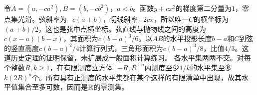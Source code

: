\documentclass[UTF8,fontset=fandol,11pt]{ctexart}
\begin{document}
令$A=(a,-ca^2),B=(b,-cb^2)$，$a<b$。函数$y+cx^2$的梯度第二分量为$1$，零点集光滑。弦斜率为$-c(a+b)$，切线斜率$-2cx$，所以唯一$C$的横坐标为$(a+b)/2$，这也是弦中点横坐标。弦直线与抛物线之间的高度为$c(x-a)(b-x)$，其面积为$c(b-a)^3/6$。以$AB$的水平投影长度$b-a$和$C$到弦的竖直高度$c(b-a)^2/4$计算行列式，三角形面积为$c(b-a)^3/8$，比值$4/3$。这道历史定理的证明保留，未扩展成一般面积计算练习。
各水平集两两不交。对每个整数$R,k\ge1$，在有限测度立方体$[-R,R]^n$内测度至少$1/k$的水平集至多$k(2R)^n$个。所有具有正测度的水平集都在某个这样的有限清单中出现，故其水平值集合至多可数，因而是$\mathbb R$的零测集。
\originalpages
\end{document}
